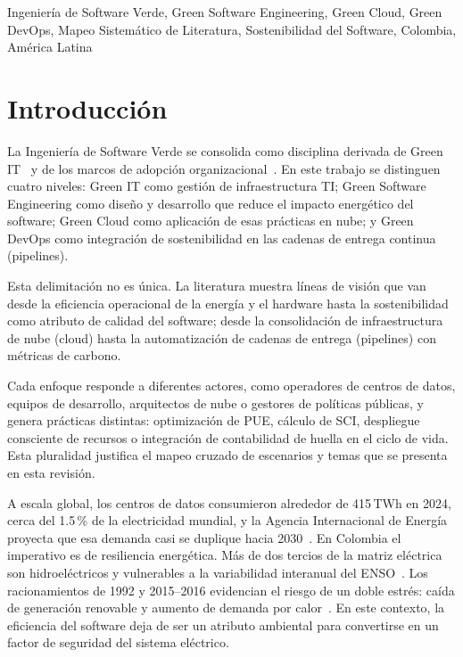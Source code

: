 \documentclass[conference]{IEEEtran}
\begin{document}
\begin{IEEEkeywords}
Ingenier\'ia de Software Verde, Green Software Engineering, Green Cloud, Green DevOps, Mapeo Sistem\'atico de Literatura, Sostenibilidad del Software, Colombia, Am\'erica Latina
\end{IEEEkeywords}

\section{Introducci\'on}
La Ingenier\'ia de Software Verde se consolida como disciplina derivada de Green IT~\cite{murugesan2008} y de los marcos de adopci\'on organizacional~\cite{molla2009}. En este trabajo se distinguen cuatro niveles: Green IT como gesti\'on de infraestructura TI; Green Software Engineering como diseño y desarrollo que reduce el impacto energ\'etico del software; Green Cloud como aplicaci\'on de esas pr\'acticas en nube; y Green DevOps como integraci\'on de sostenibilidad en las cadenas de entrega continua (pipelines).

Esta delimitaci\'on no es \'unica. La literatura muestra l\'ineas de visi\'on que van desde la eficiencia operacional de la energ\'ia y el hardware hasta la sostenibilidad como atributo de calidad del software; desde la consolidaci\'on de infraestructura de nube (cloud) hasta la automatizaci\'on de cadenas de entrega (pipelines) con m\'etricas de carbono.

Cada enfoque responde a diferentes actores, como operadores de centros de datos, equipos de desarrollo, arquitectos de nube o gestores de pol\'iticas p\'ublicas, y genera pr\'acticas distintas: optimizaci\'on de PUE, c\'alculo de SCI, despliegue consciente de recursos o integraci\'on de contabilidad de huella en el ciclo de vida. Esta pluralidad justifica el mapeo cruzado de escenarios y temas que se presenta en esta revisi\'on.

A escala global, los centros de datos consumieron alrededor de 415\,TWh en 2024, cerca del 1.5\,\% de la electricidad mundial, y la Agencia Internacional de Energ\'ia proyecta que esa demanda casi se duplique hacia 2030~\cite{iea2025energyai}. En Colombia el imperativo es de resiliencia energ\'etica. M\'as de dos tercios de la matriz el\'ectrica son hidroel\'ectricos y vulnerables a la variabilidad interanual del ENSO~\cite{ng2017,latif2009}. Los racionamientos de 1992 y 2015--2016 evidencian el riesgo de un doble estr\'es: ca\'ida de generaci\'on renovable y aumento de demanda por calor~\cite{crea2026}. En este contexto, la eficiencia del software deja de ser un atributo ambiental para convertirse en un factor de seguridad del sistema el\'ectrico.
\end{document}
